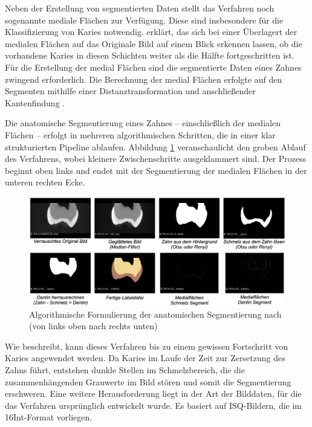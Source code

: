 Neben der Erstellung von segmentierten Daten stellt das Verfahren noch
sogenannte mediale Flächen zur Verfügung. Diese sind insbesondere für die Klassifizierung
von Karies notwendig. \citet[S.~42]{hoffmann2020} erklärt, das sich bei einer
Überlagert der medialen Flächen auf das Originale Bild auf einem Blick erkennen
lassen, ob die vorhandene Karies in diesen Schichten weiter als die Hälfte fortgeschritten
ist. Für die Erstellung der medial Flächen sind die segmentierte Daten eines
Zahnes zwingend erforderlich. Die Berechnung der medial Flächen erfolgte auf den
Segmenten mithilfe einer Distanztransformation und anschließender Kantenfindung \citep[vgl.][S.~42]{hoffmann2020}.

Die anatomische Segmentierung eines Zahnes – einschließlich der medialen Flächen
– erfolgt in mehreren algorithmischen Schritten, die in einer klar strukturierten
Pipeline ablaufen. Abbildung \ref{fig:anatomische_segmentierung} veranschaulicht
den groben Ablauf des Verfahrens, wobei kleinere Zwischenschritte ausgeklammert sind.
Der Prozess beginnt oben links und endet mit der Segmentierung der medialen
Flächen in der unteren rechten Ecke.

\begin{figure}[h]
	\centering
	\includegraphics[width=1\textwidth]{img/anatomischeSegmentierung.png}
	\caption{Algorithmische Formulierung der anatomischen Segmentierung nach
	\citet{hoffmann2020} (von links oben nach rechts unten)}
	\label{fig:anatomische_segmentierung}
\end{figure}

Wie \citet[S.~55]{hoffmann2020} beschreibt, kann dieses Verfahren bis zu einem gewissen
Fortschritt von Karies angewendet werden. Da Karies im Laufe der Zeit zur
Zersetzung des Zahns führt, entstehen dunkle Stellen im Schmelzbereich, die die
zusammenhängenden Grauwerte im Bild stören und somit die Segmentierung
erschweren. Eine weitere Herausforderung liegt in der Art der Bilddaten, für die
das Verfahren ursprünglich entwickelt wurde. Es basiert auf \ac{ISQ}-Bildern, die
im \ac{16Int}-Format vorliegen.


